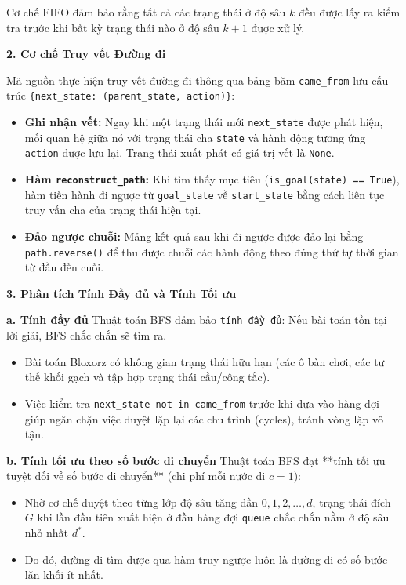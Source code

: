 \documentclass[12pt,a4paper]{article}
\begin{document}
Cơ chế FIFO đảm bảo rằng tất cả các trạng thái ở độ sâu $k$ đều được lấy ra kiểm tra trước khi bất kỳ trạng thái nào ở độ sâu $k+1$ được xử lý.

\textbf{2. Cơ chế Truy vết Đường đi}

Mã nguồn thực hiện truy vết đường đi thông qua bảng băm \texttt{came\_from} lưu cấu trúc \texttt{\{next\_state: (parent\_state, action)\}}:

\begin{itemize}
    \item \textbf{Ghi nhận vết:} Ngay khi một trạng thái mới \texttt{next\_state} được phát hiện, mối quan hệ giữa nó với trạng thái cha \texttt{state} và hành động tương ứng \texttt{action} được lưu lại. Trạng thái xuất phát có giá trị vết là \texttt{None}.
    \item \textbf{Hàm \texttt{reconstruct\_path}:} Khi tìm thấy mục tiêu (\texttt{is\_goal(state) == True}), hàm tiến hành đi ngược từ \texttt{goal\_state} về \texttt{start\_state} bằng cách liên tục truy vấn cha của trạng thái hiện tại.
    \item \textbf{Đảo ngược chuỗi:} Mảng kết quả sau khi đi ngược được đảo lại bằng \texttt{path.reverse()} để thu được chuỗi các hành động theo đúng thứ tự thời gian từ đầu đến cuối.
\end{itemize}

\textbf{3. Phân tích Tính Đầy đủ và Tính Tối ưu}

\textbf{a. Tính đầy đủ}
Thuật toán BFS đảm bảo \texttt{tính đầy đủ}: Nếu bài toán tồn tại lời giải, BFS chắc chắn sẽ tìm ra.
\begin{itemize}
    \item Bài toán Bloxorz có không gian trạng thái hữu hạn (các ô bàn chơi, các tư thế khối gạch và tập hợp trạng thái cầu/công tắc).
    \item Việc kiểm tra \texttt{next\_state not in came\_from} trước khi đưa vào hàng đợi giúp ngăn chặn việc duyệt lặp lại các chu trình (cycles), tránh vòng lặp vô tận.
\end{itemize}

\textbf{b. Tính tối ưu theo số bước di chuyển}
Thuật toán BFS đạt **tính tối ưu tuyệt đối về số bước di chuyển** (chi phí mỗi nước đi $c = 1$):
\begin{itemize}
    \item Nhờ cơ chế duyệt theo từng lớp độ sâu tăng dần $0, 1, 2, \dots, d$, trạng thái đích $G$ khi lần đầu tiên xuất hiện ở đầu hàng đợi \texttt{queue} chắc chắn nằm ở độ sâu nhỏ nhất $d^*$.
    \item Do đó, đường đi tìm được qua hàm truy ngược luôn là đường đi có số bước lăn khối ít nhất.
\end{itemize}
\end{document}

